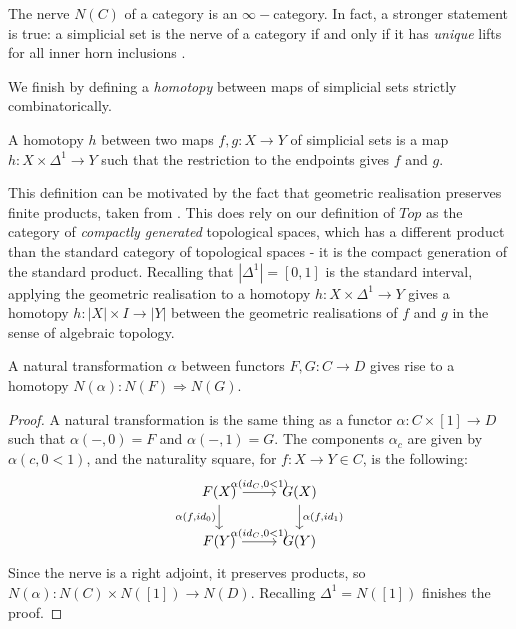 \begin{example}\label{nerve-is-infty}
The nerve $N(C)$ of a category is an $\infty-$category. In fact, a stronger statement is true: a simplicial set is the nerve of a category if and only if it has \textit{unique} lifts for all inner horn inclusions \cite{Land}.
\end{example}

We finish by defining a \textit{homotopy} between maps of simplicial sets strictly combinatorically. 

\begin{definition}
    A homotopy $h$ between two maps $f,g:X\rightarrow Y$ of simplicial sets is a map $h:X\times \Delta^1\rightarrow Y$ such that the restriction to the endpoints gives $f$ and $g$.
\end{definition}

This definition can be motivated by the fact that geometric realisation preserves finite products, taken from \cite{Gabriel}. This does rely on our definition of $Top$ as the category of \textit{compactly generated} topological spaces, which has a different product than the standard category of topological spaces - it is the compact generation of the standard product. Recalling that $|\Delta^1|=[0,1]$ is the standard interval, applying the geometric realisation to a homotopy $h:X\times \Delta^1\rightarrow Y$ gives a homotopy $h:|X|\times I\rightarrow |Y|$ between the geometric realisations of $f$ and $g$ in the sense of algebraic topology.

\begin{lemma}\label{lem:natural-transformation-is-homotopy}
    A natural transformation $\alpha$ between functors $F,G:C\rightarrow D$ gives rise to a homotopy $N(\alpha):N(F)\Rightarrow N(G)$. 
    \end{lemma}
\begin{proof}A natural transformation is the same thing as a functor $\alpha:C\times [1]\rightarrow D$ such that $\alpha(-,0)=F$ and $\alpha(-,1)=G$. The components $\alpha_c$ are given by $\alpha(c,0<1)$, and the naturality square, for $f:X\rightarrow Y\in C$, is the following:
\[\begin{tikzcd}
F(X) \arrow[d, "{\alpha(f,id_0)}"'] \arrow[r, "{\alpha(id_C,0<1)}"] & G(X) \arrow[d, "{\alpha(f,id_1)}"] \\
F(Y) \arrow[r, "{\alpha(id_C,0<1)}"]                                & G(Y)                              
\end{tikzcd}\]
 Since the nerve is a right adjoint, it preserves products, so $N(\alpha):N(C)\times N([1])\rightarrow N(D)$. Recalling $\Delta^1=N([1])$ finishes the proof.
\end{proof}

